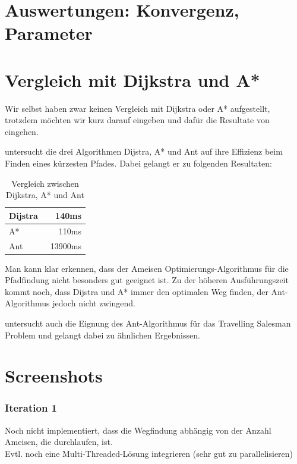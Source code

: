 \section{Auswertungen: Konvergenz, Parameter}

\section{Vergleich mit Dijkstra und A*}

Wir selbst haben zwar keinen Vergleich mit Dijkstra oder A* aufgestellt, trotzdem möchten wir kurz darauf eingeben und dafür die Resultate von \citet*{leo-perf} eingehen.

\citeauthor*{leo-perf} untersucht die drei Algorithmen Dijstra, A* und Ant auf ihre Effizienz beim Finden eines kürzesten Pfades. Dabei gelangt er zu folgenden Resultaten:

\begin{table}[h]
\begin{tabular}{ | l | r | }
\hline
Dijstra & ~140ms \\
\hline
A* & ~110ms \\
\hline
Ant & ~13900ms \\
\hline
\end{tabular}
\caption{Vergleich zwischen Dijkstra, A* und Ant}
\end{table}

Man kann klar erkennen, dass der Ameisen Optimierungs-Algorithmus für die Pfadfindung nicht besonders gut geeignet ist. Zu der höheren Ausführungszeit kommt noch, dass Dijstra und A* immer den optimalen Weg finden, der Ant-Algorithmus jedoch nicht zwingend.

\citeauthor*{leo-perf} untersucht auch die Eignung des Ant-Algorithmus für das Travelling Salesman Problem und gelangt dabei zu ähnlichen Ergebnissen.

\section{Screenshots}

\subsubsection*{Iteration 1}

Noch nicht implementiert, dass die Wegfindung abhängig von der Anzahl Ameisen, die durchlaufen, ist. \\

Evtl. noch eine Multi-Threaded-Lösung integrieren (sehr gut zu parallelisieren) \\

